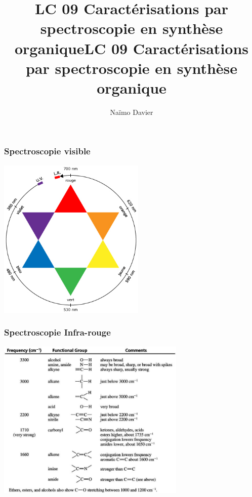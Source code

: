 \documentclass{beamer}
\title{LC 09 Caractérisations par spectroscopie en synthèse organique}
\author{Naïmo Davier}
\begin{document}
	
\begin{frame}
	\titlepage
\end{frame}

\addtocounter{framenumber}{-1}

\title{LC 09 Caractérisations par spectroscopie en synthèse organique}

\begin{frame}

\frametitle{Spectroscopie visible}
\centerline{\includegraphics[width=7cm]{couleurs}}
\end{frame}


\begin{frame}
\frametitle{Spectroscopie Infra-rouge}

\centerline{\includegraphics[width=9cm]{IR-Table}}
\end{frame}
\end{document}
